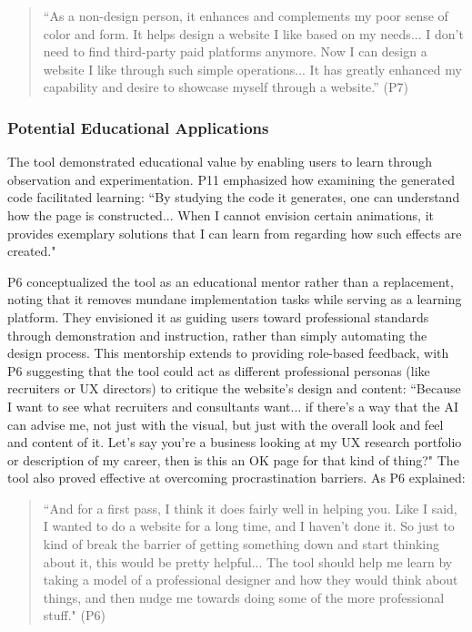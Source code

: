 \begin{quote}
``As a non-design person, it enhances and complements my poor sense of color and form. It helps design a website I like based on my needs... I don't need to find third-party paid platforms anymore. Now I can design a website I like through such simple operations... It has greatly enhanced my capability and desire to showcase myself through a website.'' (P7)
\end{quote}

\subsubsection{Potential Educational Applications}
The tool demonstrated educational value by enabling users to learn through observation and experimentation. P11 emphasized how examining the generated code facilitated learning: ``By studying the code it generates, one can understand how the page is constructed... When I cannot envision certain animations, it provides exemplary solutions that I can learn from regarding how such effects are created."

P6 conceptualized the tool as an educational mentor rather than a replacement, noting that it removes mundane implementation tasks while serving as a learning platform. They envisioned it as guiding users toward professional standards through demonstration and instruction, rather than simply automating the design process. This mentorship extends to providing role-based feedback, with P6 suggesting that the tool could act as different professional personas (like recruiters or UX directors) to critique the website's design and content: ``Because I want to see what recruiters and consultants want... if there's a way that the AI can advise me, not just with the visual, but just with the overall look and feel and content of it. Let's say you're a business looking at my UX research portfolio or description of my career, then is this an OK page for that kind of thing?" The tool also proved effective at overcoming procrastination barriers. As P6 explained:

\begin{quote}
``And for a first pass, I think it does fairly well in helping you. Like I said, I wanted to do a website for a long time, and I haven't done it. So just to kind of break the barrier of getting something down and start thinking about it, this would be pretty helpful... The tool should help me learn by taking a model of a professional designer and how they would think about things, and then nudge me towards doing some of the more professional stuff." (P6)
\end{quote}

